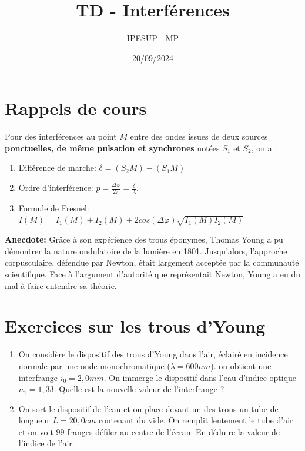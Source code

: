 \documentclass{article}
\title{TD - Interférences }
\author{IPESUP - MP }
\date{20/09/2024}
\begin{document}
\maketitle



\section{Rappels de cours}

Pour des interférences au point $M$ entre des ondes issues de deux sources \textbf{ponctuelles, de même pulsation et synchrones} notées $S_1$ et $S_2$, on a : \\
\begin{enumerate}
  \item Différence de marche: $\delta = (S_2M) - (S_1M)$
  \item Ordre d'interférence: $p=\frac{\Delta \varphi }{2 \pi} = \frac{\delta}{\lambda}$. 
  \item Formule de Fresnel: $I(M) = I_1(M) + I_2(M) + 2 cos (\Delta \varphi) \sqrt{I_1(M) I_2(M) } $
\end{enumerate}

\textbf{Anecdote: } Grâce à son expérience des trous éponymes, Thomas Young a pu démontrer la nature ondulatoire de la lumière en 1801. 
Jusqu'alors, l'approche corpusculaire, défendue par Newton, était largement acceptée par la communauté scientifique. 
Face à l'argument d'autorité que représentait Newton, Young a eu du mal à faire entendre sa théorie. 

\section{Exercices sur les trous d'Young}

\begin{enumerate}
  \item On considère le dispositif des trous d'Young dans l'air, éclairé en incidence normale par une onde monochromatique ($\lambda =600 nm$).  on obtient une interfrange $i_0 = 2,0mm$.  On immerge le dispositif dans l'eau d'indice optique $n_1 = 1,33$.   Quelle est la nouvelle valeur de l'interfrange ? 
  \item On sort le dispositif de l'eau et on place devant un des trous un tube de longueur $L=20,0cm$ contenant du vide. On remplit lentement le tube d'air et on voit 99 franges défiler au centre de l'écran. En déduire la valeur de l'indice de l'air.  
\end{enumerate}
\end{document}
